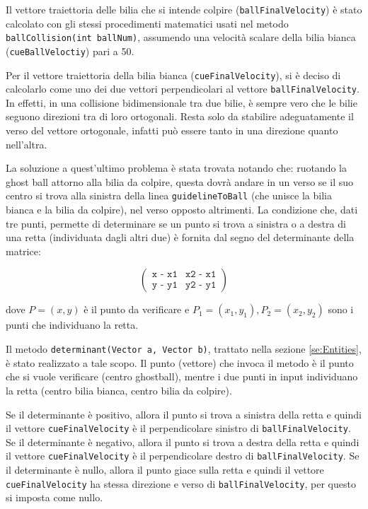 \documentclass[12pt,a4paper]{report}
\begin{document}
Il vettore traiettoria delle bilia che si intende colpire (\texttt{ballFinalVelocity}) è stato calcolato con gli stessi procedimenti matematici usati nel metodo \texttt{ballCollision(int ballNum)}, assumendo una velocità scalare della bilia bianca (\texttt{cueBallVeloctiy}) pari a 50.

Per il vettore traiettoria della bilia bianca (\texttt{cueFinalVelocity}), si è deciso di calcolarlo come uno dei due vettori perpendicolari al vettore \texttt{ballFinalVelocity}. In effetti, in una collisione bidimensionale tra due bilie, è sempre vero che le bilie seguono direzioni tra di loro ortogonali. Resta solo da stabilire adeguatamente il verso del vettore ortogonale, infatti può essere tanto in una direzione quanto nell'altra.

\vspace{3mm}

La soluzione a quest'ultimo problema è stata trovata notando che: ruotando la ghost ball attorno alla bilia da colpire, questa dovrà andare in un verso se il suo centro si trova alla sinistra della linea \texttt{guidelineToBall} (che unisce la bilia bianca e la bilia da colpire), nel verso opposto altrimenti.
La condizione che, dati tre punti, permette di determinare se un punto si trova a sinistra o a destra di una retta (individuata dagli altri due) è fornita dal segno del determinante della matrice:

\[
\begin{pmatrix}
\texttt{x - x1} & \texttt{x2 - x1}\\
\texttt{y - y1} & \texttt{y2 - y1}
\end{pmatrix}
\]

dove $P = (x, y)$ è il punto da verificare e $P_1 = (x_1, y_1), P_2 = (x_2, y_2)$ sono i punti che individuano la retta. \cite{PointSideLineMath}\cite{PointSideLineCode}

\vspace{3mm}

Il metodo \texttt{determinant(Vector a, Vector b)}, trattato nella sezione \ref{se:Entities}, è stato realizzato a tale scopo.
Il punto (vettore) che invoca il metodo è il punto che si vuole verificare (centro ghostball), mentre i due punti in input individuano la retta (centro bilia bianca, centro bilia da colpire).

\vspace{3mm}

Se il determinante è positivo, allora il punto si trova a sinistra della retta e quindi il vettore \texttt{cueFinalVelocity} è il perpendicolare sinistro di \texttt{ballFinalVelocity}.
Se il determinante è negativo, allora il punto si trova a destra della retta e quindi il vettore \texttt{cueFinalVelocity} è il perpendicolare destro di \texttt{ballFinalVelocity}.
Se il determinante è nullo, allora il punto giace sulla retta e quindi il vettore \texttt{cueFinalVelocity} ha stessa direzione e verso di \texttt{ballFinalVelocity}, per questo si imposta come nullo.
\end{document}
